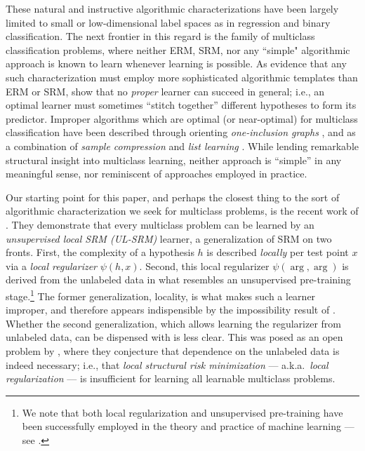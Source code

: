 These natural and instructive algorithmic characterizations have been largely limited to small or low-dimensional label spaces as in regression and binary classification. The next frontier in this regard is the family of multiclass classification problems, where neither ERM, SRM, nor any ``simple" algorithmic approach is known to learn whenever learning is possible. As evidence that any such characterization must employ more sophisticated algorithmic templates than ERM or SRM, \cite{DS14} show that no \emph{proper} learner can succeed in general; i.e., an optimal learner must sometimes ``stitch together'' different hypotheses to form its predictor. 
Improper algorithms which are optimal (or near-optimal) for multiclass classification have been described through orienting \emph{one-inclusion graphs} \citep{rubinstein2006shifting,DS14,aden2023optimal}, and as a combination of \emph{sample compression} and \emph{list learning} \citep{brukhim2022characterization}. While lending remarkable structural insight into multiclass learning, neither approach is ``simple'' in any meaningful sense, nor reminiscent of approaches employed in practice.

Our starting point for this paper, and perhaps the closest thing to the sort of algorithmic characterization we seek for multiclass problems, is the recent work of \cite{asilis2024regularization}. They demonstrate that every multiclass problem can be learned by an \emph{unsupervised local SRM (UL-SRM)} learner, a generalization of SRM on two fronts. First, the complexity of a hypothesis $h$ is described \emph{locally} per test point $x$ via a \emph{local regularizer} $\psi(h,x)$. Second, this local regularizer $\psi(\arg, \arg)$ is derived from the unlabeled data in what resembles an unsupervised pre-training stage.\footnote{We note that both local regularization and unsupervised pre-training have been successfully employed in the theory and practice of machine learning --- see \cite{wolf2008local,prost2021learning,vavskevivcius2023suboptimality,geprovable,azoury2001relative,vovk2001competitive}.} The former generalization, locality, is what makes such a learner improper, and therefore appears indispensible by the impossibility result of \cite{DS14}. Whether the second generalization, which allows learning the regularizer from unlabeled data, can be dispensed with is less clear. This was posed as an open problem by \cite{asilis-open-problem}, where they conjecture that dependence on the unlabeled data is indeed necessary; i.e., that \emph{local structural risk minimization} --- a.k.a.~\emph{local regularization} --- is insufficient for learning all learnable multiclass problems. 

